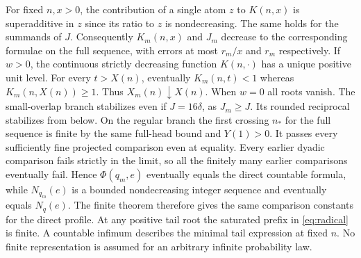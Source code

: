 For fixed $n,x>0$, the contribution of a single atom $z$ to $K(n,x)$
is superadditive in $z$ since its ratio to $z$ is nondecreasing.
The same holds for the summands of $J$. Consequently $K_m(n,x)$ and
$J_m$ decrease to the corresponding formulae on the full sequence, with
errors at most $r_m/x$ and $r_m$ respectively. If $w>0$, the continuous
strictly decreasing function $K(n,\cdot)$ has a unique positive unit level.
For every $t>X(n)$, eventually $K_m(n,t)<1$ whereas $K_m(n,X(n))\ge1$.
Thus $X_m(n)\downarrow X(n)$. When $w=0$ all roots vanish. The small-overlap
branch stabilizes even if $J=16\delta$, as $J_m\ge J$. Its rounded reciprocal
stabilizes from below. On the regular branch the first crossing $n_*$ for
the full sequence is finite by the same full-head bound and $Y(1)>0$.
It passes every sufficiently fine projected comparison even at equality.
Every earlier dyadic comparison fails strictly in the limit, so all the
finitely many earlier comparisons eventually fail. Hence $\Phi(q_m,e)$
eventually equals the direct countable formula, while $N_{q_m}(e)$ is a
bounded nondecreasing integer sequence and eventually equals $N_q(e)$.
The finite theorem therefore gives the same comparison constants for the
direct profile. At any positive tail root the saturated prefix in
\eqref{eq:radical} is finite. A countable infimum describes the minimal
tail expression at fixed $n$. No finite representation is assumed for
an arbitrary infinite probability law.
